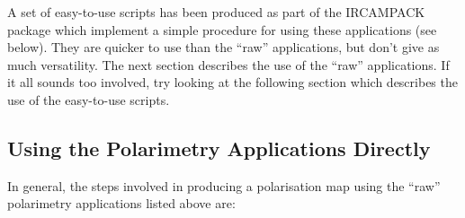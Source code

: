 A set of easy-to-use scripts has been produced as part of the {\small
IRCAMPACK} package which implement a simple procedure for using these
applications (see below). They are quicker to use than the ``raw''
applications, but don't give as much versatility. The next section
describes the use of the ``raw'' applications. If it all sounds too
involved, try looking at the following section which describes the use
of the easy-to-use scripts.

\subsection{Using the Polarimetry Applications Directly}

In general, the steps involved in producing a polarisation map using
the ``raw'' polarimetry applications listed above are:

